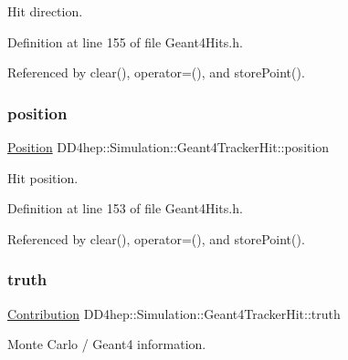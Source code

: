 Hit direction. 



Definition at line 155 of file Geant4\+Hits.\+h.



Referenced by clear(), operator=(), and store\+Point().

\hypertarget{class_d_d4hep_1_1_simulation_1_1_geant4_tracker_hit_a76e77eb92142c6f794ac37b6471df512}{}\label{class_d_d4hep_1_1_simulation_1_1_geant4_tracker_hit_a76e77eb92142c6f794ac37b6471df512} 
\subsubsection{\texorpdfstring{position}{position}}
{\footnotesize\ttfamily \hyperlink{namespace_d_d4hep_1_1_geometry_a55083902099d03506c6db01b80404900}{Position} D\+D4hep\+::\+Simulation\+::\+Geant4\+Tracker\+Hit\+::position}



Hit position. 



Definition at line 153 of file Geant4\+Hits.\+h.



Referenced by clear(), operator=(), and store\+Point().

\hypertarget{class_d_d4hep_1_1_simulation_1_1_geant4_tracker_hit_a154bd6a86c7e962c8e6bb4b010318a45}{}\label{class_d_d4hep_1_1_simulation_1_1_geant4_tracker_hit_a154bd6a86c7e962c8e6bb4b010318a45} 
\subsubsection{\texorpdfstring{truth}{truth}}
{\footnotesize\ttfamily \hyperlink{class_d_d4hep_1_1_simulation_1_1_geant4_hit_a03a5270c4d1410302fe278ce6a47f268}{Contribution} D\+D4hep\+::\+Simulation\+::\+Geant4\+Tracker\+Hit\+::truth}



Monte Carlo / Geant4 information. 



